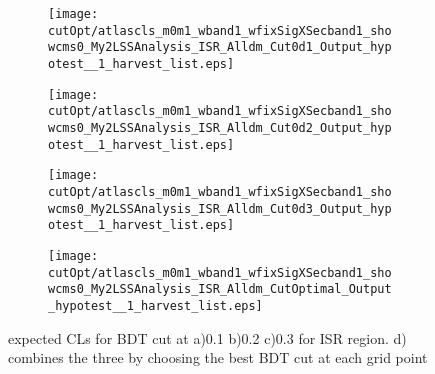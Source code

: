 \begin{figure}
	\centering
    \begin{subfigure}[b]{0.4\textwidth}
        \texttt{[image: cutOpt/atlascls\_m0m1\_wband1\_wfixSigXSecband1\_showcms0\_My2LSSAnalysis\_ISR\_Alldm\_Cut0d1\_Output\_hypotest\_\_1\_harvest\_list.eps]}
        \caption{}
    \end{subfigure}
    \begin{subfigure}[b]{0.4\textwidth}
        \texttt{[image: cutOpt/atlascls\_m0m1\_wband1\_wfixSigXSecband1\_showcms0\_My2LSSAnalysis\_ISR\_Alldm\_Cut0d2\_Output\_hypotest\_\_1\_harvest\_list.eps]}
        \caption{}
    \end{subfigure}

    \begin{subfigure}[b]{0.4\textwidth}
        \texttt{[image: cutOpt/atlascls\_m0m1\_wband1\_wfixSigXSecband1\_showcms0\_My2LSSAnalysis\_ISR\_Alldm\_Cut0d3\_Output\_hypotest\_\_1\_harvest\_list.eps]}
        \caption{}
    \end{subfigure}
    \begin{subfigure}[b]{0.4\textwidth}
        \texttt{[image: cutOpt/atlascls\_m0m1\_wband1\_wfixSigXSecband1\_showcms0\_My2LSSAnalysis\_ISR\_Alldm\_CutOptimal\_Output\_hypotest\_\_1\_harvest\_list.eps]}
        \caption{}
    \end{subfigure}

\caption{expected CLs for BDT cut at a)0.1 b)0.2 c)0.3 for ISR region. d) combines the three by choosing the best BDT cut at each grid point }
\label{fig:ISR_BDTCut_CLs}
\end{figure}

